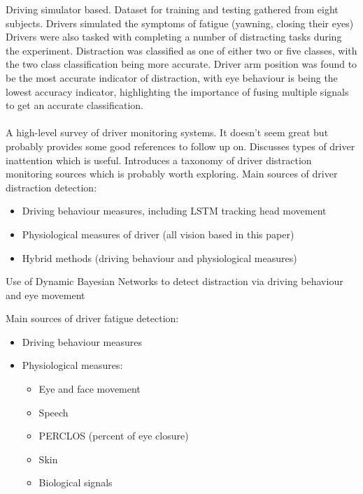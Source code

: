 \documentclass[11pt, parskip=half*,twoside=false]{scrbook}
\begin{document}
Driving simulator based. Dataset for training and testing gathered from eight subjects. Drivers simulated the symptoms of fatigue (yawning, closing their eyes) Drivers were also tasked with completing a number of distracting tasks during the experiment. Distraction was classified as one of either two or five classes, with the two class classification being more accurate. Driver arm position was found to be the most accurate indicator of distraction, with eye behaviour is being the lowest accuracy indicator, highlighting the importance of fusing multiple signals to get an accurate classification. 



\paragraph{\citep{koesdwiadyRecentTrendsDriver2017}} A high-level survey of driver monitoring systems. It doesn't seem great but probably provides some good references to follow up on. Discusses types of driver inattention which is useful. Introduces a taxonomy of driver distraction monitoring sources which is probably worth exploring. Main sources of driver distraction detection:
\begin{itemize}
	\item Driving behaviour measures, including LSTM tracking head movement \citep{wollmerOnlineDriverDistraction2011}
	\item Physiological measures of driver (all vision based in this paper)
	\item Hybrid methods (driving behaviour and physiological measures)
\end{itemize}

Use of Dynamic Bayesian Networks to detect distraction via driving behaviour and eye movement \citep{liangHybridBayesianNetwork2014}

Main sources of driver fatigue detection:
\begin{itemize}
	\item Driving behaviour measures
	\item Physiological measures:
	\begin{itemize}
		\item Eye and face movement
		\item Speech
		\item PERCLOS (percent of eye closure)
		\item Skin \citep{kurianDrowsinessDetectionUsing2014a}
		\item Biological signals \citep{zhangAutomatedDetectionDriver2014}
	\end{itemize}
\end{itemize}
\end{document}
